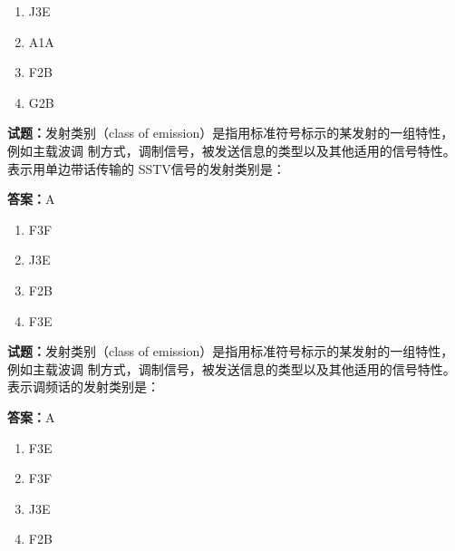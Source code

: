 \documentclass{ctexbook}
\begin{document}
\begin{enumerate}[leftmargin=3em]
  \item J3E 

  \item A1A 

  \item F2B 

  \item G2B 

\end{enumerate}





\vspace{1em}

\textbf{试题：}发射类别（class of emission）是指用标准符号标示的某发射的一组特性，例如主载波调
制方式，调制信号，被发送信息的类型以及其他适用的信号特性。表示用单边带话传输的
SSTV信号的发射类别是： 

\textbf{答案：}A 

\begin{enumerate}[leftmargin=3em]
  \item F3F 

  \item J3E 


  \item F2B 

  \item F3E 

\end{enumerate}





\vspace{1em}

\textbf{试题：}发射类别（class of emission）是指用标准符号标示的某发射的一组特性，例如主载波调
制方式，调制信号，被发送信息的类型以及其他适用的信号特性。表示调频话的发射类别是： 

\textbf{答案：}A 

\begin{enumerate}[leftmargin=3em]
  \item F3E 

  \item F3F 

  \item J3E 

  \item F2B 

\end{enumerate}
\end{document}
